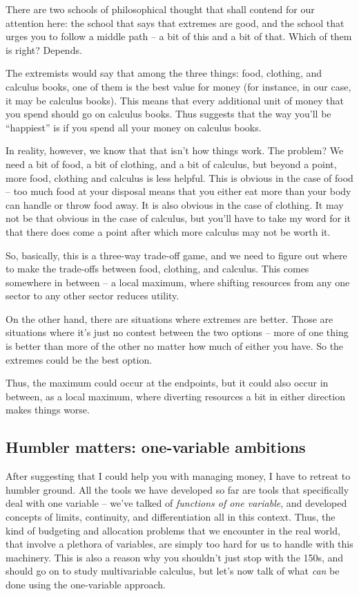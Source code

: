 \documentclass[10pt]{amsart}
\begin{document}
There are two schools of philosophical thought that shall contend for
our attention here: the school that says that extremes are good, and
the school that urges you to follow a middle path -- a bit of this and
a bit of that. Which of them is right? Depends.

The extremists would say that among the three things: food, clothing,
and calculus books, one of them is the best value for money (for
instance, in our case, it may be calculus books). This means that
every additional unit of money that you spend should go on calculus
books. Thus suggests that the way you'll be ``happiest'' is if you
spend all your money on calculus books.

In reality, however, we know that that isn't how things work. The
problem? We need a bit of food, a bit of clothing, and a bit of
calculus, but beyond a point, more food, clothing and calculus is less
helpful. This is obvious in the case of food -- too much food at your
disposal means that you either eat more than your body can handle or
throw food away. It is also obvious in the case of clothing. It may
not be that obvious in the case of calculus, but you'll have to take
my word for it that there does come a point after which more calculus
may not be worth it.

So, basically, this is a three-way trade-off game, and we need to
figure out where to make the trade-offs between food, clothing, and
calculus. This comes somewhere in between -- a local maximum, where
shifting resources from any one sector to any other sector reduces
utility.

On the other hand, there are situations where extremes are
better. Those are situations where it's just no contest between the
two options -- more of one thing is better than more of the other no
matter how much of either you have. So the extremes could be the best
option.

Thus, the maximum could occur at the endpoints, but it could also
occur in between, as a local maximum, where diverting resources a bit
in either direction makes things worse.

\subsection{Humbler matters: one-variable ambitions}

After suggesting that I could help you with managing money, I have to
retreat to humbler ground. All the tools we have developed so far are
tools that specifically deal with one variable -- we've talked of {\em
functions of one variable}, and developed concepts of limits,
continuity, and differentiation all in this context. Thus, the kind of
budgeting and allocation problems that we encounter in the real world,
that involve a plethora of variables, are simply too hard for us to
handle with this machinery. This is also a reason why you shouldn't
just stop with the 150s, and should go on to study multivariable
calculus, but let's now talk of what {\em can} be done using the
one-variable approach.
\end{document}
